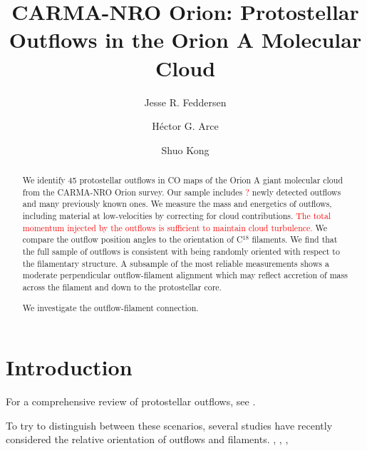 \documentclass[twocolumn]{aastex63}
\newcommand{\numnew}{?}
\begin{document}
\title{CARMA-NRO Orion: Protostellar Outflows in the Orion A Molecular Cloud}

\author{Jesse R. Feddersen}
\author{H\'ector G. Arce}
\author{Shuo Kong}


\begin{abstract}
We identify 45 protostellar outflows in CO maps of the Orion A giant molecular cloud from the CARMA-NRO Orion survey. Our sample includes \textcolor{red}{\numnew{}} newly detected outflows and many previously known ones. We measure the mass and energetics of outflows, including material at low-velocities by correcting for cloud contributions. \textcolor{red}{The total momentum injected by the outflows is sufficient to maintain cloud turbulence.} We compare the outflow position angles to the orientation of C$^{18}$ filaments. We find that the full sample of outflows is consistent with being randomly oriented with respect to the filamentary structure. A subsample of the most reliable measurements shows a moderate perpendicular outflow-filament alignment which may reflect accretion of mass across the filament and down to the protostellar core.  %

We investigate the outflow-filament connection.
\end{abstract}


\section{Introduction}
For a comprehensive review of protostellar outflows, see \citet{Bally16}.




To try to distinguish between these scenarios, several studies have recently considered the relative orientation of outflows and filaments.
\citet{Stephens17}, \citet{Kong19}, \citet{Davis09}, \citet{Tanabe:submitted}
\end{document}
